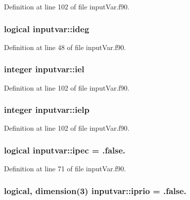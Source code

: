 Definition at line 102 of file input\-Var.\-f90.

\hypertarget{classinputvar_a62235e6c8b16a98c1aea10ac01e11ac9}{
\subsubsection[{ideg}]{\setlength{\rightskip}{0pt plus 5cm}logical inputvar\-::ideg}}\label{classinputvar_a62235e6c8b16a98c1aea10ac01e11ac9}


Definition at line 48 of file input\-Var.\-f90.

\hypertarget{classinputvar_a6f9a3a8beea8f6e1aa8140bab654a48f}{
\subsubsection[{iel}]{\setlength{\rightskip}{0pt plus 5cm}integer inputvar\-::iel}}\label{classinputvar_a6f9a3a8beea8f6e1aa8140bab654a48f}


Definition at line 102 of file input\-Var.\-f90.

\hypertarget{classinputvar_a0190bc42c3dad91d811c585952ff55f4}{
\subsubsection[{ielp}]{\setlength{\rightskip}{0pt plus 5cm}integer inputvar\-::ielp}}\label{classinputvar_a0190bc42c3dad91d811c585952ff55f4}


Definition at line 102 of file input\-Var.\-f90.

\hypertarget{classinputvar_af90e08308cf6a7de1480cfde429187d3}{
\subsubsection[{ipec}]{\setlength{\rightskip}{0pt plus 5cm}logical inputvar\-::ipec = .false.}}\label{classinputvar_af90e08308cf6a7de1480cfde429187d3}


Definition at line 71 of file input\-Var.\-f90.

\hypertarget{classinputvar_a4bacf572842e302cf317a3cc5e95a9b9}{
\subsubsection[{iprio}]{\setlength{\rightskip}{0pt plus 5cm}logical, dimension(3) inputvar\-::iprio = .false.}}\label{classinputvar_a4bacf572842e302cf317a3cc5e95a9b9}


